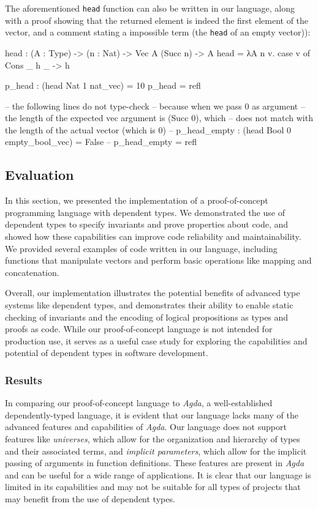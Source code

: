 \documentclass[12pt]{article}
\theoremstyle{definition}
\newcommand{\code}[1]{\texttt{#1}}
\begin{document}
The aforementioned \code{head} function can also be written in our language, along with a proof showing that the returned element is indeed the first element of the vector, and a comment stating a impossible term (the \code{head} of an empty vector)): 
\begin{piforall}
head : (A : Type) -> (n : Nat) -> Vec A (Succ n) -> A
head = λA n v. case v of {
  Cons _ h _ -> h
}

p_head : (head Nat 1 nat_vec) = 10
p_head = refl

-- the following lines do not type-check
-- because when we pass 0 as argument
-- the length of the expected vec argument is (Succ 0), which
-- does not match with the length of the actual vector (which is 0)
-- p_head_empty : (head Bool 0 empty_bool_vec) = False
-- p_head_empty = refl
\end{piforall}

\subsection{Evaluation}

In this section, we presented the implementation of a proof-of-concept programming language with dependent types. We demonstrated the use of dependent types to specify invariants and prove properties about code, and showed how these capabilities can improve code reliability and maintainability. We provided several examples of code written in our language, including functions that manipulate vectors and perform basic operations like mapping and concatenation.

Overall, our implementation illustrates the potential benefits of advanced type systems like dependent types, and demonstrates their ability to enable static checking of invariants and the encoding of logical propositions as types and proofs as code. While our proof-of-concept language is not intended for production use, it serves as a useful case study for exploring the capabilities and potential of dependent types in software development.

\subsubsection{Results}

In comparing our proof-of-concept language to \emph{Agda}, a well-established dependently-typed language, it is evident that our language lacks many of the advanced features and capabilities of \emph{Agda}. Our language does not support features like \emph{universes}, which allow for the organization and hierarchy of types and their associated terms, and \emph{implicit parameters}, which allow for the implicit passing of arguments in function definitions. These features are present in \emph{Agda} and can be useful for a wide range of applications. It is clear that our language is limited in its capabilities and may not be suitable for all types of projects that may benefit from the use of dependent types.
\end{document}
